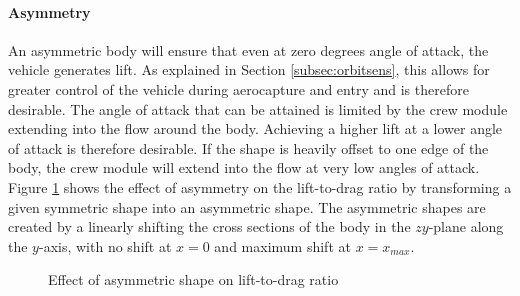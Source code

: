 \paragraph{Asymmetry}
An asymmetric body will ensure that even at zero degrees angle of attack, the vehicle generates lift. As explained in Section \ref{subsec:orbitsens}, this allows for greater control of the vehicle during aerocapture and entry and is therefore desirable. The angle of attack that can be attained is limited by the crew module extending into the flow around the body. Achieving a higher lift at a lower angle of attack is therefore desirable. If the shape is heavily offset to one edge of the body, the crew module will extend into the flow at very low angles of attack. Figure \ref{fig:LDSkew} shows the effect of asymmetry on the lift-to-drag ratio by transforming a given symmetric shape into an asymmetric shape. The asymmetric shapes are created by a linearly shifting the cross sections of the body in the $zy$-plane along the $y$-axis, with no shift at $x=0$ and maximum shift at $x=x_{max}$. 

\begin{figure}[h]
	\hspace{-8mm}
	\setlength{} 
	\setlength{}
	
	\caption{Effect of asymmetric shape on lift-to-drag ratio}
	\label{fig:LDSkew}
\end{figure}
